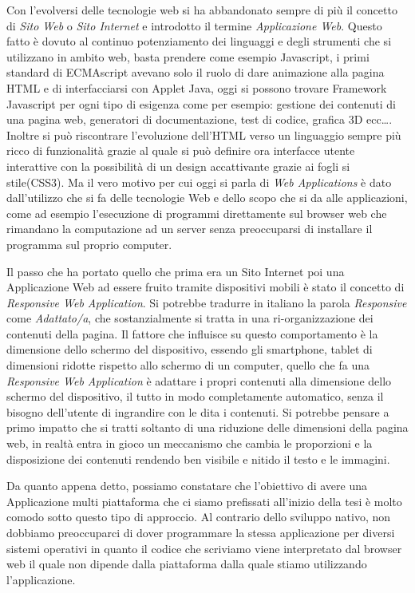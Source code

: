 Con l'evolversi delle tecnologie web si ha abbandonato sempre di più il concetto di \emph{Sito Web} o \emph{Sito Internet} e introdotto il termine \emph{Applicazione Web}. Questo fatto è dovuto al continuo potenziamento dei linguaggi e degli strumenti che si utilizzano in ambito web, basta prendere come esempio Javascript, i primi standard di ECMAscript avevano solo il ruolo di dare animazione alla pagina HTML e di interfacciarsi con Applet Java, oggi si possono trovare Framework Javascript per ogni tipo di esigenza come per esempio: gestione dei contenuti di una pagina web, generatori di documentazione, test di codice, grafica 3D ecc\ldots. Inoltre si può riscontrare l'evoluzione dell'HTML verso un linguaggio sempre più ricco di funzionalità grazie al quale si può definire ora interfacce utente interattive con la possibilità di un design accattivante grazie ai fogli si stile(CSS3). Ma il vero motivo per cui oggi si parla di  \emph{Web Applications} è dato dall'utilizzo che si fa delle tecnologie Web e dello scopo che si da alle applicazioni, come ad esempio l'esecuzione di programmi direttamente sul browser web che rimandano la computazione ad un server senza preoccuparsi di installare il programma sul proprio computer.

Il passo che ha portato quello che prima era un Sito Internet poi una Applicazione Web ad essere fruito tramite dispositivi mobili è stato il concetto di \emph{Responsive Web Application}. Si potrebbe tradurre in italiano la parola \emph{Responsive} come \emph{Adattato/a}, che sostanzialmente si tratta in una ri-organizzazione dei contenuti della pagina. Il fattore che influisce su questo comportamento è la dimensione dello schermo del dispositivo, essendo gli smartphone, tablet di dimensioni ridotte rispetto allo schermo di un computer, quello che fa una \emph{Responsive Web Application} è adattare i propri contenuti alla dimensione dello schermo del dispositivo, il tutto in modo completamente automatico, senza il bisogno dell'utente di ingrandire con le dita i contenuti. Si potrebbe pensare a primo impatto che si tratti soltanto di una riduzione delle dimensioni della pagina web, in realtà entra in gioco un meccanismo che cambia le proporzioni e la disposizione dei contenuti rendendo ben visibile e nitido il testo e le immagini.
   
Da quanto appena detto, possiamo constatare che l'obiettivo di avere una Applicazione multi piattaforma che ci siamo prefissati all'inizio della tesi è molto comodo sotto questo tipo di approccio. Al contrario dello sviluppo nativo, non dobbiamo preoccuparci di dover programmare la stessa applicazione per diversi sistemi operativi in quanto il codice che scriviamo viene interpretato dal browser web il quale non dipende dalla piattaforma dalla quale stiamo utilizzando l'applicazione.

